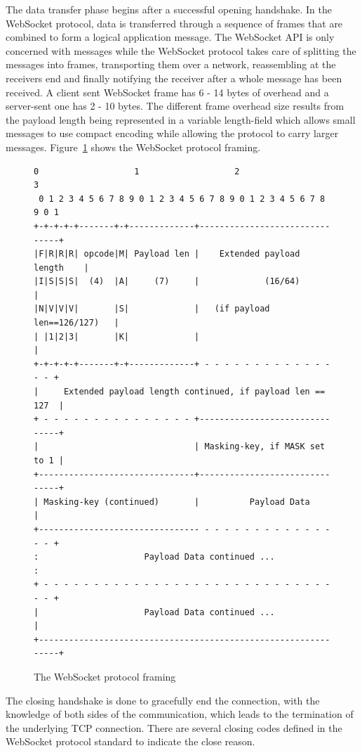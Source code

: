 \noindent
The data transfer phase begins after a successful opening handshake. In the WebSocket protocol, data is transferred through a sequence of frames that are combined to form a logical application message. The WebSocket API is only concerned with messages while the WebSocket protocol takes care of splitting the messages into frames, transporting them over a network, reassembling at the receivers end and finally notifying the receiver after a whole message has been received. A client sent WebSocket frame has 6 - 14 bytes of overhead and a server-sent one has 2 - 10 bytes. The different frame overhead size results from the payload length being represented in a variable length-field which allows small messages to use compact encoding while allowing the protocol to carry larger messages. Figure~\ref{protocol-framing} shows the WebSocket protocol framing.
\\
\begin{figure}[h!]
\begin{Verbatim}[fontsize=\small]
 0                   1                   2                   3
 0 1 2 3 4 5 6 7 8 9 0 1 2 3 4 5 6 7 8 9 0 1 2 3 4 5 6 7 8 9 0 1
+-+-+-+-+-------+-+-------------+-------------------------------+
|F|R|R|R| opcode|M| Payload len |    Extended payload length    |
|I|S|S|S|  (4)  |A|     (7)     |             (16/64)           |
|N|V|V|V|       |S|             |   (if payload len==126/127)   |
| |1|2|3|       |K|             |                               |
+-+-+-+-+-------+-+-------------+ - - - - - - - - - - - - - - - +
|     Extended payload length continued, if payload len == 127  |
+ - - - - - - - - - - - - - - - +-------------------------------+
|                               | Masking-key, if MASK set to 1 |
+-------------------------------+-------------------------------+
| Masking-key (continued)       |          Payload Data         |
+-------------------------------- - - - - - - - - - - - - - - - +
:                     Payload Data continued ...                :
+ - - - - - - - - - - - - - - - - - - - - - - - - - - - - - - - +
|                     Payload Data continued ...                |
+---------------------------------------------------------------+
\end{Verbatim}
\caption{The WebSocket protocol framing}
\label{protocol-framing}
\end{figure}

\noindent
The closing handshake is done to gracefully end the connection, with the knowledge of both sides of the communication, which leads to the termination of the underlying TCP connection. There are several closing codes defined in the WebSocket protocol standard to indicate the close reason.

